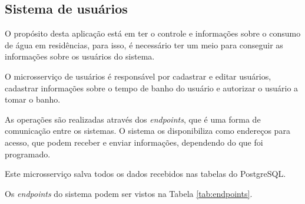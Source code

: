 \subsection{Sistema de usuários} \label{sec:usuarios}

O propósito desta aplicação está em ter o controle e informações sobre o consumo de água em residências, para isso, é necessário ter um meio para conseguir as informações sobre os usuários do sistema. 

O microsserviço de usuários é responsável por cadastrar e editar usuários, cadastrar informações sobre o tempo de banho do usuário e autorizar o usuário a tomar o banho.

As operações são realizadas através dos \textit{endpoints}, que é uma forma de comunicação entre os sistemas. O sistema os disponibiliza como endereços para acesso, que podem receber e enviar informações, dependendo do que foi programado.

Este microsserviço salva todos os dados recebidos nas tabelas do PostgreSQL.

Os \textit{endpoints} do sistema podem ser vistos na Tabela \ref{tab:endpoints}.


